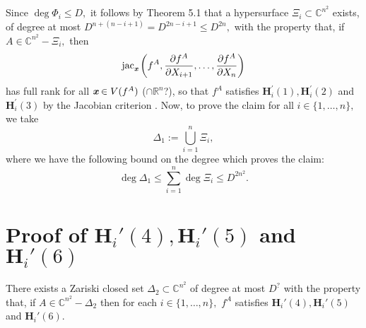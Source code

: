 \documentclass[sigconf]{acmart}
\def\xb{\textit{\textbf{x}}}
\def\C{\mathbb{C}}
\def\R{\mathbb{R}}
\def\jac{ \textrm{jac}}
\def\pa{\partial}
\begin{document}
%
Since $\deg \Phi_i \leq D,$ it follows by Theorem 5.1 that a hypersurface $\Xi_i \subset \C^{n^2}$ exists, of degree at most $D^{n+(n-i+1)}=D^{2n-i+1}\leq D^{2n},$ with the property that, if $A \in \C^{n^2}-\Xi_i,$ then 
%
\[
 \jac_\xb \left(f^A,\frac{\pa f^A}{\pa X_{i+1}},\hdots,\frac{\pa f^A}{\pa X_n}\right)
\]
has full rank for all $\xb \in V(f^A)$ ($\cap \R^n$?), so that  $f^A$ satisfies $\textbf{H}_i^{'}(1),\textbf{H}_i^{'}(2)$ and $\textbf{H}_i^{'}(3)$ by the Jacobian criterion \cite[Theorem 16.19]{ECA}. Now, to prove the claim for all $i \in \{1,\hdots,n\},$ we take
\[
\Delta_1 := \bigcup_{i=1}^n \Xi_i,
\]
where we have the following bound on the degree which proves the claim:
\[
\deg \Delta_1 \leq \sum_{i=1}^n \deg \Xi_i  \leq D^{2n^2}.
\] 
%
%
%
%
\section{Proof of $\textbf{H}_i'(4),\textbf{H}_i'(5)$ and $\textbf{H}_i'(6)$}
%
\begin{theorem}
There exists a Zariski closed set $\Delta_2 \subset \C^{n^2}$ of degree at most $D^{\textrm{?}}$ with the property that, if $A \in \C^{n^2} - \Delta_2$ then for each $i \in \{1,\hdots,n\},$ $f^A$ satisfies $\textbf{H}_i'(4),\textbf{H}_i'(5)$ and $\textbf{H}_i'(6)$.
\end{theorem}
%
\end{document}
